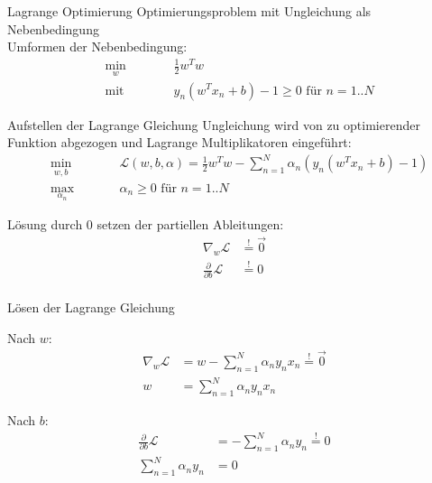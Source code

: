 \documentclass[ngerman]{beamer}
\newcommand{\Lagr}{\mathcal{L}}
\begin{document}
\begin{frame}{Lagrange Optimierung}
	Optimierungsproblem mit Ungleichung als Nebenbedingung \\
	Umformen der Nebenbedingung:
	\begin{subequations}
		\begin{alignat*}{2}
			&\!\min_{w}        &\qquad&  \frac{1}{2} w^{T} w\\
			&\text{mit } &      & y_n (w^{T} x_{n} + b)-1 \geq 0 \text{ für } n=1..N
		\end{alignat*}
	\end{subequations}
\end{frame}

\begin{frame}{Aufstellen der Lagrange Gleichung}
	Ungleichung wird von zu optimierender Funktion abgezogen und Lagrange Multiplikatoren eingeführt:
	\begin{subequations}
		\begin{alignat*}{2}
			&\!\min_{w, b}        &\qquad&  \Lagr (w, b, \alpha) = \frac{1}{2} w^{T} w - \sum_{n=1}^{N} \alpha_{n} (y_n (w^{T} x_{n} + b)-1)\\
			&\max_{\alpha_{n}} &      & \alpha_{n} \geq 0 \text{ für } n=1..N
		\end{alignat*}
	\end{subequations}

	Lösung durch $0$ setzen der partiellen Ableitungen:
	\begin{equation*}
		\begin{aligned}
			\nabla_{w} \Lagr &\overset{!}{=} \vec{0} \\
			\frac{\partial}{\partial b} \Lagr &\overset{!}{=} 0 \\
		\end{aligned}
	\end{equation*}
	
\end{frame}

\begin{frame}{Lösen der Lagrange Gleichung}

	Nach $w$:
	\begin{equation*}
		\begin{aligned}
			\nabla_{w} \Lagr &= w - \sum_{n=1}^{N} \alpha_{n} y_{n} x_{n} \overset{!}{=} \vec{0} \\
			w &= \sum_{n=1}^{N} \alpha_{n} y_{n} x_{n}
		\end{aligned}
	\end{equation*}

	Nach $b$:
	\begin{equation*}
		\begin{aligned}
			\frac{\partial}{\partial b} \Lagr &= - \sum_{n=1}^{N} \alpha_{n} y_{n} \overset{!}{=} 0 \\
			\sum_{n=1}^{N} \alpha_{n} y_{n} &= 0
		\end{aligned}
	\end{equation*}
\end{frame}
\end{document}
